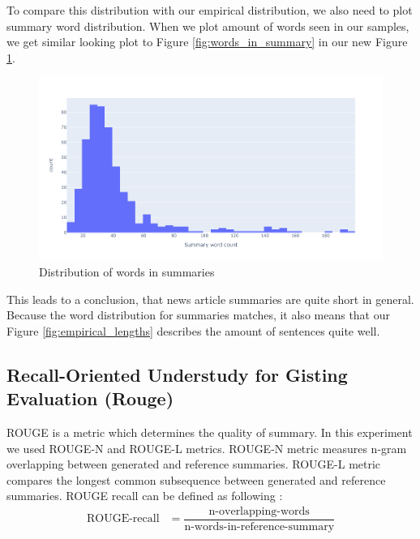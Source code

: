 \documentclass{article}
\begin{document}
\noindent
To compare this distribution with our empirical distribution, we also need to plot summary word distribution. When we plot amount of words seen in our samples, we get similar looking plot to Figure \ref{fig:words_in_summary} in our new Figure \ref{fig:empirical_summary_words}.\\

\noindent
\begin{figure}[H]
	\centering
	\hspace*{-3cm}
	\includegraphics[scale=0.55]{empirical_summary_words.png}
	\caption{Distribution of words in summaries}
	\label{fig:empirical_summary_words}
\end{figure}

\noindent
This leads to a conclusion, that news article summaries are quite short in general. Because the word distribution for summaries matches, it also means that our Figure \ref{fig:empirical_lengths} describes the amount of sentences quite well.\\

\subsection{Recall-Oriented Understudy for Gisting Evaluation (Rouge)}

ROUGE is a metric which determines the quality of summary. In this experiment we used ROUGE-N and ROUGE-L metrics. ROUGE-N metric measures n-gram overlapping between generated and reference summaries. ROUGE-L metric compares the longest common subsequence between generated and reference summaries. ROUGE recall can be defined as following \cite{rouge}: \\

\begin{align*}
	\text{ROUGE-recall} &= \dfrac{\text{n-overlapping-words}}{\text{n-words-in-reference-summary}}
\end{align*}\\
\end{document}
